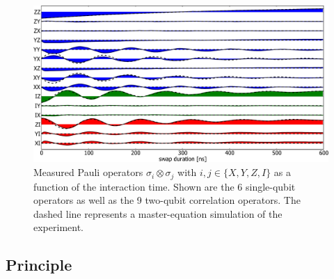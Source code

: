 \begin{figure}
   \centering
	 \includegraphics[width=1.\textwidth]{"./data/ct5/film of swap/pauli_set_vs_time_with_simulation"}
	 \caption[test]{Measured Pauli operators $\sigma_i \otimes \sigma_j$ with $i,j \in \{X,Y,Z,I\}$ as a function of the interaction time. Shown are the 6 single-qubit operators as well as the 9 two-qubit correlation operators. The dashed line represents a master-equation simulation of the experiment.}
	 \label{fig:swap_pauli_set_vs_time_with_simulation}
\end{figure}

\subsection{Principle}

